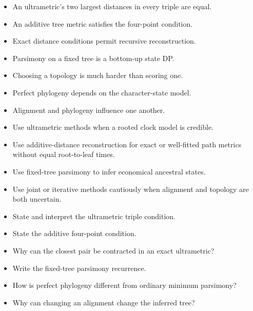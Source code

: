 \documentclass[11pt]{article}
\begin{document}
\begin{tcolorbox}[enhanced,breakable,title={Key takeaways},
  colback=white,colframe=Primary,fonttitle=\small\sffamily\bfseries,fontupper=\footnotesize,
  boxsep=0.6mm,left=1.5mm,right=1.5mm,top=1mm,bottom=1mm,before skip=3pt,after skip=3pt]
\begin{itemize}
  \item An ultrametric's two largest distances in every triple are equal.
  \item An additive tree metric satisfies the four-point condition.
  \item Exact distance conditions permit recursive reconstruction.
  \item Parsimony on a fixed tree is a bottom-up state DP.
  \item Choosing a topology is much harder than scoring one.
  \item Perfect phylogeny depends on the character-state model.
  \item Alignment and phylogeny influence one another.
\end{itemize}
\end{tcolorbox}

\begin{tcolorbox}[enhanced,breakable,title={Algorithm selection / when to use this},
  colback=Primary!3,colframe=Primary,fonttitle=\small\sffamily\bfseries,fontupper=\footnotesize,
  boxsep=0.6mm,left=1.5mm,right=1.5mm,top=1mm,bottom=1mm,before skip=3pt,after skip=3pt]
\begin{itemize}
  \item Use ultrametric methods when a rooted clock model is credible.
  \item Use additive-distance reconstruction for exact or well-fitted path metrics without equal root-to-leaf times.
  \item Use fixed-tree parsimony to infer economical ancestral states.
  \item Use joint or iterative methods cautiously when alignment and topology are both uncertain.
\end{itemize}
\end{tcolorbox}

\begin{tcolorbox}[enhanced,breakable,title={Self-test questions},
  colback=white,colframe=Accent,fonttitle=\small\sffamily\bfseries,fontupper=\footnotesize,
  boxsep=0.6mm,left=1.5mm,right=1.5mm,top=1mm,bottom=1mm,before skip=3pt,after skip=3pt]
\begin{itemize}
  \item State and interpret the ultrametric triple condition.
  \item State the additive four-point condition.
  \item Why can the closest pair be contracted in an exact ultrametric?
  \item Write the fixed-tree parsimony recurrence.
  \item How is perfect phylogeny different from ordinary minimum parsimony?
  \item Why can changing an alignment change the inferred tree?
\end{itemize}
\end{tcolorbox}
\end{document}
